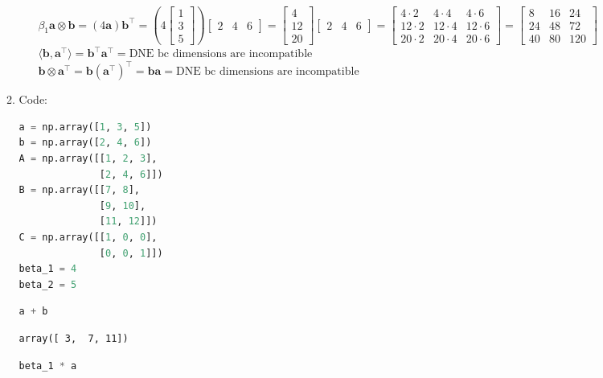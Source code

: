 \documentclass[11pt,letterpaper]{article}
\begin{document}
\begin{enumerate}
\begin{enumerate}
\begin{enumerate}
             $\beta_1 \mathbf{a} \otimes \mathbf{b} = (4\mathbf{a})\mathbf{b}^\top = \left(4 \begin{bmatrix} 1 \\ 3 \\ 5 \end{bmatrix}\right) \begin{bmatrix} 2 & 4 & 6 \end{bmatrix} = \begin{bmatrix} 4 \\ 12 \\ 20 \end{bmatrix} \begin{bmatrix} 2 & 4 & 6 \end{bmatrix} = \begin{bmatrix} 4 \cdot 2 & 4 \cdot 4 & 4 \cdot 6 \\ 12 \cdot 2 & 12 \cdot 4 & 12 \cdot 6 \\ 20 \cdot 2 & 20 \cdot 4 & 20 \cdot 6 \end{bmatrix} = \begin{bmatrix} 8 & 16 & 24 \\ 24 & 48 & 72 \\ 40 & 80 & 120 \end{bmatrix}$\\
             $\langle\mathbf{b}, \mathbf{a}^\top\rangle = \mathbf{b}^\top\mathbf{a}^\top = \text{DNE bc dimensions are incompatible}$\\
             $\mathbf{b} \otimes \mathbf{a}^\top = \mathbf{b}(\mathbf{a}^\top)^\top = \mathbf{b}\mathbf{a} = \text{DNE bc dimensions are incompatible}$
\end{enumerate}
\item Code:
\begin{lstlisting}[language=python]
a = np.array([1, 3, 5])
b = np.array([2, 4, 6])
A = np.array([[1, 2, 3],
              [2, 4, 6]])
B = np.array([[7, 8],
              [9, 10],
              [11, 12]])
C = np.array([[1, 0, 0],
              [0, 0, 1]])
beta_1 = 4
beta_2 = 5
\end{lstlisting}
\begin{lstlisting}[language=python]
a + b
\end{lstlisting}
\begin{verbatim}
array([ 3,  7, 11])
\end{verbatim}
\begin{lstlisting}[language=python]
beta_1 * a
\end{lstlisting}
\begin{verbatim}

\end{verbatim}
\end{enumerate}
\end{enumerate}
\end{document}
